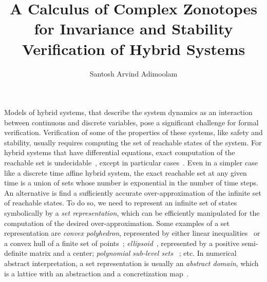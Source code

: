 \documentclass[11pt,a4paper,twoside,openright]{article}
\title{A Calculus of Complex Zonotopes for Invariance and Stability Verification of Hybrid Systems}
\author{Santosh Arvind Adimoolam}
\date{}
\begin{document}
\maketitle Models of hybrid systems, that describe the system dynamics
as an interaction between continuous and discrete variables, pose a
significant challenge for formal verification.  Verification of some
of the properties of these systems, like safety and stability, usually
requires computing the set of reachable states of the system.  For
hybrid systems that have differential equations, exact computation of
the reachable set is undecidable~\cite{alur1995algorithmic}, except in
particular cases~\cite{lafferriere1998decidable}.  Even in a simpler
case like a discrete time affine hybrid system, the exact reachable
set at any given time is a union of sets whose number is exponential
in the number of time steps.  An alternative is find a sufficiently
accurate over-approximation of the infinite set of reachable states.
To do so, we need to represent an infinite set of states symbolically
by a {\it set representation}, which can be efficiently manipulated
for the computation of the desired over-approximation.  Some examples
of a set representation are {\it convex polyhedron}, represented by
either linear
inequalities~\cite{cousot1978automatic,Sankaranarayanan+Dang+Ivancic-08-Symbolic,FLD+11}
or a convex hull of a finite set of points~\cite{kvasnica2004multi};
{\it
  ellipsoid}~\cite{DBLP:journals/tecs/AllamigeonGSGP16,kurzhanskiy2006ellipsoidal},
represented by a positive semi-definite matrix and a center; {\it
  polynomial sub-level
  sets}~\cite{DBLP:conf/esop/AdjeGG10,prajna2004safety} ; etc.  In
numerical abstract interpretation, a set representation is usually an
{\it abstract domain}, which is a lattice with an abstraction and a
concretization map~\cite{jeannet2009apron}.
\end{document}
